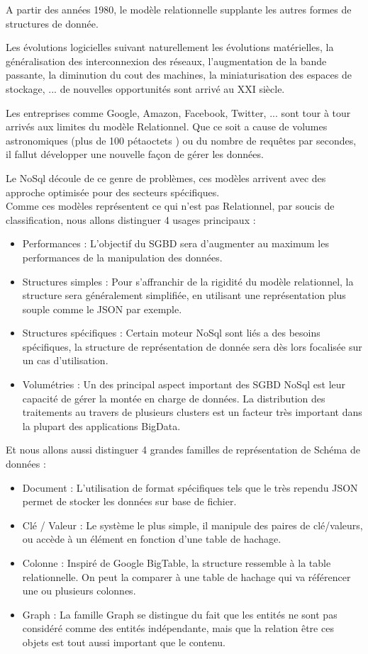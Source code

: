\documentclass[a4paper,fleqn,12pt]{report}
\begin{document}
A partir des années 1980, le modèle relationnelle supplante les autres formes de structures de donnée.

Les évolutions logicielles suivant naturellement les évolutions matérielles, la généralisation des interconnexion des réseaux, l'augmentation de la bande passante, la diminution du cout des machines, la miniaturisation des espaces de stockage, ... de nouvelles opportunités sont arrivé au XXI siècle.

Les entreprises comme Google, Amazon, Facebook, Twitter, ... sont tour à tour arrivés aux limites du modèle Relationnel. Que ce soit a cause de volumes astronomiques (plus de 100 pétaoctets ) ou du nombre de requêtes par secondes, il fallut développer une nouvelle façon de gérer les données.

Le NoSql découle de ce genre de problèmes, ces modèles arrivent avec des approche optimisée pour des secteurs spécifiques. \\
Comme ces modèles représentent ce qui n'est pas Relationnel, par soucis de classification, nous allons distinguer 4 usages principaux :

\begin{itemize}
\item Performances : L'objectif du SGBD sera d'augmenter au maximum les performances de la manipulation des données. 
\item Structures simples : Pour s'affranchir de la rigidité du modèle relationnel, la structure sera généralement simplifiée, en utilisant une représentation plus souple comme le JSON par exemple.
\item Structures spécifiques : Certain moteur NoSql sont liés a des besoins spécifiques, la structure de représentation de donnée sera dès lors focalisée sur un cas d'utilisation.
\item Volumétries : Un des principal aspect important des SGBD NoSql est leur capacité de gérer la montée en charge de données. La distribution des traitements au travers de plusieurs clusters est un facteur très important dans la plupart des applications BigData.
\end{itemize} 

Et nous allons aussi distinguer 4 grandes familles de représentation de Schéma de données :

\begin{itemize}
\item Document : L'utilisation de format spécifiques tels que le très rependu JSON permet de stocker les données sur base de fichier.
\item Clé / Valeur : Le système le plus simple, il manipule des paires de clé/valeurs, ou accède à un élément en fonction d'une table de hachage.
\item Colonne : Inspiré de Google BigTable, la structure ressemble à la table relationnelle. On peut la comparer à une table de hachage qui va référencer une ou plusieurs colonnes.
\item Graph : La famille Graph se distingue du fait que les entités ne sont pas considéré comme des entités indépendante, mais que la relation être ces objets est tout aussi important que le contenu.
\end{itemize} 
\end{document}
